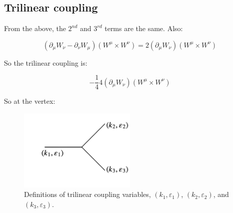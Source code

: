 \subsection{Trilinear coupling}

From the above, the $2^{nd}$ and $3^{rd}$ terms are the same.  Also:

\[
  \left(\partial_{\mu}W_{\nu} - \partial_{\nu}W_{\mu}\right)\left(W^{\mu}\times W^{\nu}\right) = 2\left(\partial_{\mu}W_{\nu}\right)\left(W^{\mu}\times W^{\nu}\right)
\]

So the trilinear coupling is:

\[
  -\frac{1}{4}4\left(\partial_{\mu}W_{\nu}\right)\left(W^{\mu}\times W^{\nu}\right)
\]

So at the vertex:

\begin{figure}[!htb]
  \begin{center}
    \includegraphics[width=0.5\textwidth]{images/web_feynman/image_78.png}
    \caption[Trilinear coupling variables]{Definitions of trilinear coupling variables, $(k_1,\varepsilon_1)$, $(k_2,\varepsilon_2)$, and $(k_3,\varepsilon_3)$.}
    \label{fig:ch15_trilinearVariables}
  \end{center}
\end{figure}


